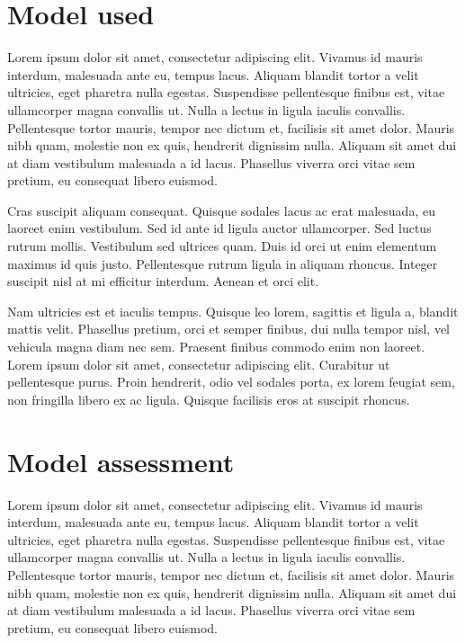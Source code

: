 \documentclass[a4paper, nobind]{templates/ociamthesis}
\theoremstyle{definition}
\theoremstyle{definition}
\theoremstyle{definition}
\theoremstyle{remark}
\begin{document}
\hypertarget{model-used}{%
\section{Model used}\label{model-used}}

Lorem ipsum dolor sit amet, consectetur adipiscing elit. Vivamus id mauris interdum, malesuada ante eu, tempus lacus. Aliquam blandit tortor a velit ultricies, eget pharetra nulla egestas. Suspendisse pellentesque finibus est, vitae ullamcorper magna convallis ut. Nulla a lectus in ligula iaculis convallis. Pellentesque tortor mauris, tempor nec dictum et, facilisis sit amet dolor. Mauris nibh quam, molestie non ex quis, hendrerit dignissim nulla. Aliquam sit amet dui at diam vestibulum malesuada a id lacus. Phasellus viverra orci vitae sem pretium, eu consequat libero euismod.

Cras suscipit aliquam consequat. Quisque sodales lacus ac erat malesuada, eu laoreet enim vestibulum. Sed id ante id ligula auctor ullamcorper. Sed luctus rutrum mollis. Vestibulum sed ultrices quam. Duis id orci ut enim elementum maximus id quis justo. Pellentesque rutrum ligula in aliquam rhoncus. Integer suscipit nisl at mi efficitur interdum. Aenean et orci elit.

Nam ultricies est et iaculis tempus. Quisque leo lorem, sagittis et ligula a, blandit mattis velit. Phasellus pretium, orci et semper finibus, dui nulla tempor nisl, vel vehicula magna diam nec sem. Praesent finibus commodo enim non laoreet. Lorem ipsum dolor sit amet, consectetur adipiscing elit. Curabitur ut pellentesque purus. Proin hendrerit, odio vel sodales porta, ex lorem feugiat sem, non fringilla libero ex ac ligula. Quisque facilisis eros at suscipit rhoncus.

\hypertarget{model-assessment}{%
\section{Model assessment}\label{model-assessment}}

Lorem ipsum dolor sit amet, consectetur adipiscing elit. Vivamus id mauris interdum, malesuada ante eu, tempus lacus. Aliquam blandit tortor a velit ultricies, eget pharetra nulla egestas. Suspendisse pellentesque finibus est, vitae ullamcorper magna convallis ut. Nulla a lectus in ligula iaculis convallis. Pellentesque tortor mauris, tempor nec dictum et, facilisis sit amet dolor. Mauris nibh quam, molestie non ex quis, hendrerit dignissim nulla. Aliquam sit amet dui at diam vestibulum malesuada a id lacus. Phasellus viverra orci vitae sem pretium, eu consequat libero euismod.
\end{document}
